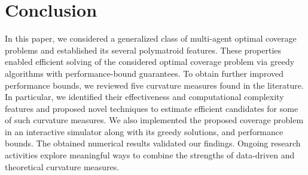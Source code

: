 \documentclass[letterpaper, 10 pt, conference]{ieeeconf}
\begin{document}
\section{Conclusion}
\label{Sec:Conclusion}

In this paper, we considered a generalized class of multi-agent optimal coverage problems and established its several polymatroid features. These properties enabled efficient solving of the considered optimal coverage problem via greedy algorithms with performance-bound guarantees. To obtain further improved performance bounds, we reviewed five curvature measures found in the literature. In particular, we identified their effectiveness and computational complexity features and proposed novel techniques to estimate efficient candidates for some of such curvature measures. We also implemented the proposed coverage problem in an interactive simulator along with its greedy solutions, and performance bounds. The obtained numerical results validated our findings. Ongoing research activities explore meaningful ways to combine the strengths of data-driven and theoretical curvature measures.

\end{document}
